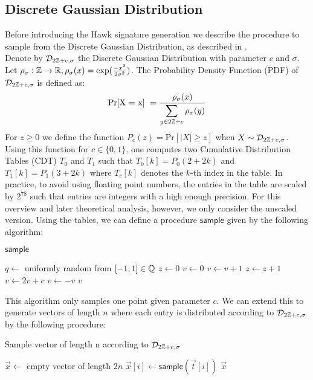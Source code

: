 \subsection{Discrete Gaussian Distribution}
Before introducing the Hawk signature generation we describe the procedure to sample from the Discrete Gaussian Distribution, as described in \cite{HawkSpec24}. \\
Denote by $\mathcal{D}_{2\mathbb{Z} + c, \sigma }$ the Discrete Gaussian Distribution with parameter $c$ and $\sigma$.
Let $\rho_{\sigma}: \mathbb{Z} \rightarrow \mathbb{R}, \rho_{\sigma}(x) = \exp(\frac{-x^2}{2\sigma^2})$.
The Probability Density Function (PDF) of $\mathcal{D}_{2\mathbb{Z} + c, \sigma }$ is defined as:
\[
    \text{Pr[X = x] } = \frac{\rho_{\sigma}(x)}{\mathlarger{\sum_{y \in 2\bb{Z} + c} \rho_{\sigma}(y)}}
\]
For $z \geq 0$ we define the function $P_c(z) = \text{Pr}[ |X| \geq z ]$ when $X \sim \mathcal{D}_{2\mathbb{Z}+c, \sigma}$.
Using this function for $c \in \{0, 1\}$, one computes two Cumulative Distribution Tables (CDT) $T_0$ and $T_1$
such that $T_0[k] = P_0(2+2k)$ and $T_1[k] = P_1(3+2k)$ where $T_c[k]$ denotes the $k$-th index in the table.
In practice, to avoid using floating point numbers, the entries in the table are scaled by $2^{78}$ such that 
entries are integers with a high enough precision. For this overview and later theoretical analysis, however, we only consider the unscaled version.
Using the tables, we can define a procedure $\mathsf{sample}$ given by the following algorithm:

\begin{algorithm}[H]\label{sample}
\caption{$\mathsf{sample}$}
\begin{algorithmic}[1]
    \State $q \gets$ uniformly random from $[-1, 1] \in \mathbb{Q}$
    \State $z \gets 0$
    \State $v \gets 0$
    \State $v \gets v + 1$
    \EndIf
    \State $z \gets z + 1$
    \State $v \gets 2v + c$
    \State $v \gets -v$
    \EndIf
    \EndWhile
    \State \Return $v$
\end{algorithmic}
\end{algorithm}

This algorithm only samples one point given parameter $c$.
We can extend this to generate vectors of length $n$ where each entry is distributed according to $\mathcal{D}_{2\mathbb{Z}+c, \sigma}$ by the following procedure:
\begin{algorithm}[H]
\caption{Sample vector of length n according to $\mathcal{D}_{2\mathbb{Z}+c, \sigma}$}
\begin{algorithmic}[1]
    \State $\vec{x} \gets$ empty vector of length $2n$
    \State $\vec{x}[i] \gets \mathsf{sample}(\vec{t}[i])$
    \EndFor
    \Return $\vec{x}$
\end{algorithmic}
\end{algorithm}

